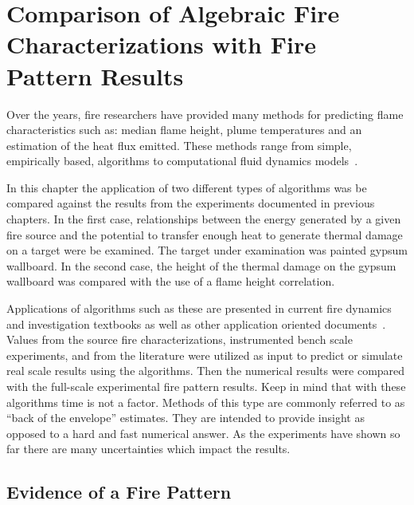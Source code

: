 \documentclass[twoside]{uocthesis}
\begin{document}
{\chapter{Comparison of Algebraic Fire Characterizations with Fire Pattern Results}

Over the years, fire researchers have provided many methods for predicting flame characteristics such as: median flame height, plume temperatures and an estimation of the heat flux emitted. These methods range from simple, empirically based, algorithms to computational fluid dynamics models~\cite{Beyler:1986,Beyler:1999,Heskestad:SFPE,FDS_Users_Guide,FDS_Tech_Guide}.  

In this chapter the application of two different types of algorithms was be compared against the results from the experiments documented in previous chapters.  In the first case, relationships between the energy generated by a given fire source and the potential to transfer enough heat to generate thermal damage on a target were be examined. The target under examination was painted gypsum wallboard.  In the second case, the height of the thermal damage on the gypsum wallboard was compared with the use of a flame height correlation. 

Applications of algorithms such as these are presented in current fire dynamics and investigation textbooks as well as other application oriented documents~\cite{Icove:2013,Quintiere:1997,Asseal:2010,Beyler:1999,NUREG_1805}.  Values from the source fire characterizations, instrumented bench scale experiments, and from the literature were utilized as input to predict or simulate real scale results using the algorithms.  Then the numerical results were compared with the full-scale experimental fire pattern results.  Keep in mind that with these algorithms time is not a factor.  Methods of this type are commonly referred to as ``back of the envelope'' estimates.  They are intended to provide insight as opposed to a hard and fast numerical answer.  As the experiments have shown so far there are many uncertainties which impact the results.            

\section{Evidence of a Fire Pattern}

}
\end{document}
